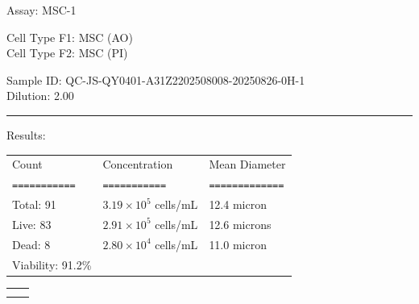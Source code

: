 \documentclass[UTF8,10pt,a4paper,fontset=fandol]{ctexart}
\begin{document}

\newpage

Assay: MSC-1

\vspace{0.8em}

Cell Type F1: MSC (AO)\\
Cell Type F2: MSC (PI)

\vspace{0.8em}

Sample ID: QC-JS-QY0401-A31Z2202508008-20250826-0H-1\\
Dilution: 2.00

\vspace{0.8em}
\hrule
\vspace{0.3em}

Results:

\vspace{0.5em}

\begin{tabular}{lll}
Count & Concentration & Mean Diameter \\
\texttt{===========} & \texttt{===========} & \texttt{=============} \\
Total: 91 & $3.19\times 10^{5}$ cells/mL & 12.4 micron \\
Live: 83 & $2.91\times 10^{5}$ cells/mL & 12.6 microns \\
Dead: 8 & $2.80\times 10^{4}$ cells/mL & 11.0 micron \\
Viability: 91.2\% & & \\
\end{tabular}

\vspace{2em}

\begin{center}
\begin{tabular}{cc}
\fbox{\rule{0pt}{4.2cm}\rule{7.2cm}{0pt}} &
\fbox{\rule{0pt}{4.2cm}\rule{7.2cm}{0pt}} \\[0.8em]
\fbox{\rule{0pt}{4.2cm}\rule{7.2cm}{0pt}} &
\fbox{\rule{0pt}{4.2cm}\rule{7.2cm}{0pt}}
\end{tabular}
\end{center}
\end{document}
